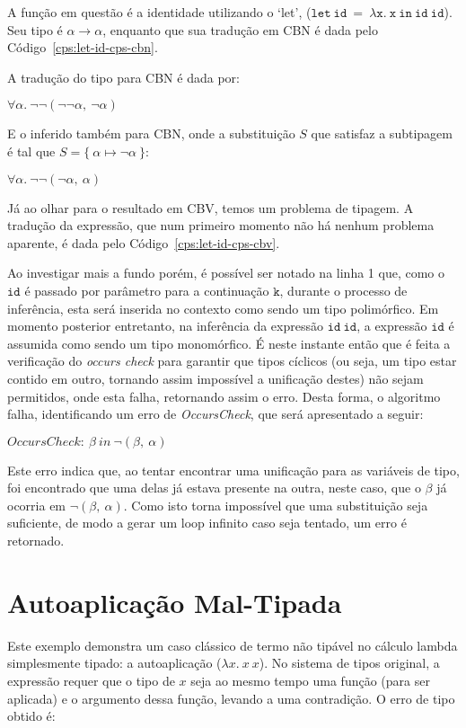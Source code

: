 A função em questão é a identidade utilizando o `let', ($\mathtt{let\ id\ =\ \lambda x.\ x\ in\ id\ id}$).
Seu tipo é $\alpha \to \alpha$, enquanto que sua tradução em CBN é dada pelo Código~\ref{cps:let-id-cps-cbn}.

A tradução do tipo para CBN é dada por:
\begin{center}
  $\forall\alpha.\ \neg\neg(\neg\neg\alpha,\ \neg\alpha)$
\end{center}
E o inferido também para CBN, onde a substituição $S$ que satisfaz a subtipagem é tal que $S = \{\ \alpha \mapsto \neg\alpha \ \}$:
\begin{center}
  $\forall\alpha.\ \neg\neg(\neg\alpha,\ \alpha)$
\end{center}
Já ao olhar para o resultado em CBV, temos um problema de tipagem.
A tradução da expressão, que num primeiro momento não há nenhum problema aparente, é dada pelo Código~\ref{cps:let-id-cps-cbv}.

Ao investigar mais a fundo porém, é possível ser notado na linha 1 que, como o $\mathtt{id}$ é passado por parâmetro para a continuação $\mathtt{k}$, durante o processo de inferência, esta será inserida no contexto como sendo um tipo polimórfico.
Em momento posterior entretanto, na inferência da expressão $\mathtt{id\ id}$, a expressão $\mathtt{id}$ é assumida como sendo um tipo monomórfico.
É neste instante então que é feita a verificação do \textit{occurs check} para garantir que tipos cíclicos (ou seja, um tipo estar contido em outro, tornando assim impossível a unificação destes) não sejam permitidos, onde esta falha, retornando assim o erro.
Desta forma, o algoritmo falha, identificando um erro de \textit{OccursCheck}, que será apresentado a seguir:
\begin{center}
  $OccursCheck{:}\ \beta\ in\ \neg(\beta,\ \alpha)$
\end{center}
Este erro indica que, ao tentar encontrar uma unificação para as variáveis de tipo, foi encontrado que uma delas já estava presente na outra, neste caso, que o $\beta$ já ocorria em $\neg(\beta,\ \alpha)$.
Como isto torna impossível que uma substituição seja suficiente, de modo a gerar um loop infinito caso seja tentado, um erro é retornado.

\section{Autoaplicação Mal-Tipada}\label{sec:autoap-mal-tipada}
Este exemplo demonstra um caso clássico de termo não tipável no cálculo lambda simplesmente tipado: a autoaplicação ($\lambda x.\ x\ x$).
No sistema de tipos original, a expressão requer que o tipo de $x$ seja ao mesmo tempo uma função (para ser aplicada) e o argumento dessa função, levando a uma contradição.
O erro de tipo obtido é:

